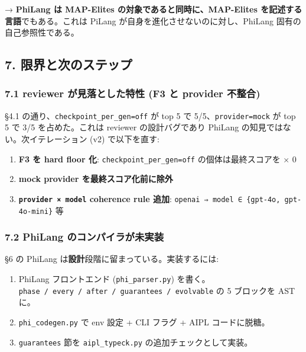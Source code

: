 \documentclass[
]{ltjsarticle}
\providecommand{\tightlist}{%
  \setlength{\itemsep}{0pt}\setlength{\parskip}{0pt}}
\begin{document}
→ \textbf{PhiLang は MAP-Elites の対象であると同時に、MAP-Elites
を記述する言語}でもある。これは PiLang
が自身を進化させないのに対し、PhiLang 固有の自己参照性である。

\subsection{7.
限界と次のステップ}\label{ux9650ux754cux3068ux6b21ux306eux30b9ux30c6ux30c3ux30d7}

\subsubsection{7.1 reviewer が見落とした特性 (F3 と provider
不整合)}\label{reviewer-ux304cux898bux843dux3068ux3057ux305fux7279ux6027-f3-ux3068-provider-ux4e0dux6574ux5408}

§4.1 の通り、\texttt{checkpoint\_per\_gen=off} が top 5 で
5/5、\texttt{provider=mock} が top 5 で 3/5 を占めた。これは reviewer
の設計バグであり PhiLang の知見ではない。次イテレーション (v2)
で以下を直す:

\begin{enumerate}
\def\labelenumi{\arabic{enumi}.}
\tightlist
\item
  \textbf{F3 を hard floor 化}: \texttt{checkpoint\_per\_gen=off}
  の個体は最終スコアを × 0
\item
  \textbf{mock provider を最終スコア化前に除外}
\item
  \textbf{\texttt{provider\ ×\ model} coherence rule 追加}:
  \texttt{openai\ ⇒\ model\ ∈\ \{gpt-4o,\ gpt-4o-mini\}} 等
\end{enumerate}

\subsubsection{7.2 PhiLang
のコンパイラが未実装}\label{philang-ux306eux30b3ux30f3ux30d1ux30a4ux30e9ux304cux672aux5b9fux88c5}

§6 の PhiLang は\textbf{設計}段階に留まっている。実装するには:

\begin{enumerate}
\def\labelenumi{\arabic{enumi}.}
\tightlist
\item
  PhiLang フロントエンド (\texttt{phi\_parser.py})
  を書く。\texttt{phase\ /\ every\ /\ after\ /\ guarantees\ /\ evolvable}
  の 5 ブロックを AST に。
\item
  \texttt{phi\_codegen.py} で env 設定 + CLI フラグ + AIPL
  コードに脱糖。
\item
  \texttt{guarantees} 節を \texttt{aipl\_typeck.py}
  の追加チェックとして実装。
\end{enumerate}
\end{document}

